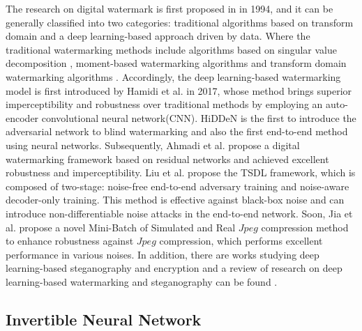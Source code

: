 \documentclass[sigconf]{acmart}
\begin{document}
The research on digital watermark is first proposed in \cite{van1994digital} in 1994, and it can be generally classified into two categories: traditional algorithms based on transform domain and a deep learning-based approach driven by data. Where the traditional watermarking methods include algorithms based on singular value decomposition \cite{soualmi2018schur,mehta2016lwt,su2014blind}, moment-based watermarking algorithms \cite{hu1962visual,hu2014orthogonal} and transform domain watermarking algorithms \cite{alotaibi2019text,hamidi2018hybrid,pakdaman2017prediction}. Accordingly, the deep learning-based watermarking model is first introduced by Hamidi et al. \cite{kandi2017exploring} in 2017, whose method brings superior imperceptibility and robustness over traditional methods by employing an auto-encoder convolutional neural network(CNN). HiDDeN \cite{zhu2018hidden} is the first to introduce the adversarial network to blind watermarking and also the first end-to-end method using neural networks. Subsequently, Ahmadi et al. \cite {ahmadi2020redmark} propose a digital watermarking framework based on residual networks and achieved excellent robustness and imperceptibility. Liu et al. \cite{liu2019novel} propose the TSDL framework, which is composed of two-stage: noise-free end-to-end adversary training and noise-aware decoder-only training. This method is effective against black-box noise and can introduce non-differentiable noise attacks in the end-to-end network. Soon, Jia et al. \cite{jia2021mbrs} propose a novel Mini-Batch of Simulated and Real $Jpeg$ compression method to enhance robustness against $Jpeg$ compression, which performs excellent performance in various noises. In addition, there are works studying deep learning-based steganography and encryption \cite{sharma2019hiding,lu2021large,wengrowski2019light,duan2019reversible,zhang2019steganogan} and a review of research on deep learning-based watermarking and steganography can be found  \cite{zhang2021brief,byrnes2021data}.









\subsection{Invertible Neural Network}
\end{document}
